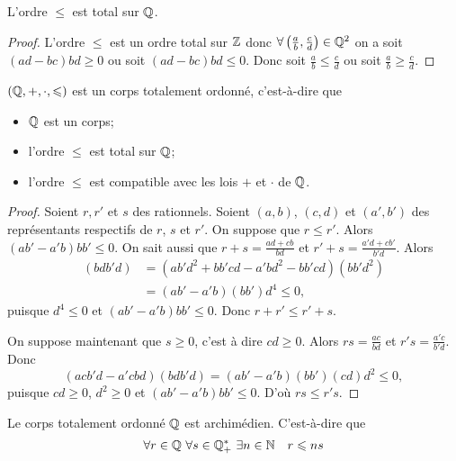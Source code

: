 \begin{prop}
  L'ordre $\leqslant $ est total sur $\mathbb{Q}$.
\end{prop}
\begin{proof}
  L'ordre $\leqslant $ est un ordre total sur $\mathbb{Z}$ donc $\forall \left( \frac{a}{b}, \frac{c}{d} \right) \in \mathbb{Q}^2$ on a soit $(ad-bc)bd \geqslant 0$ ou soit $(ad-bc)bd \leqslant 0$. Donc soit $\frac{a}{b} \leqslant \frac{c}{d}$ ou soit $\frac{a}{b} \geqslant \frac{c}{d}$.
\end{proof}
\begin{prop}
  $(\mathbb{Q},+,\cdot, \leqslant)$ est un corps totalement ordonné, c'est-à-dire que
  \begin{itemize}
  \item $\mathbb{Q}$ est un corps;
  \item l'ordre $\leqslant$ est total sur $\mathbb{Q}$;
  \item l'ordre $\leqslant$ est compatible avec les lois $+$ et $\cdot$ de $\mathbb{Q}$.
  \end{itemize}
\end{prop}
\begin{proof}
  Soient $r,r'$ et $s$ des rationnels. Soient $(a,b)$, $(c,d)$ et $(a',b')$ des représentants respectifs de $r$, $s$ et $r'$. On suppose que $r \leqslant r'$. Alors $(ab'-a'b)bb' \leqslant 0$. On sait aussi que $r+s = \frac{ad+cb}{bd}$ et $r'+s=\frac{a'd+cb'}{b'd}$. Alors
  \begin{align}
    [(ad+bc)b'd-(a'd+cb')bd](bdb'd) &= (ab'd^2+bb'cd-a'bd^2-bb'cd)(bb'd^2) \\
    &=(ab'-a'b)(bb')d^4 \leqslant 0,
  \end{align}
  puisque $d^4 \leqslant 0$ et $(ab'-a'b)bb' \leqslant 0$. Donc $r+r' \leqslant r'+s$.

  On suppose maintenant que $s \geqslant 0$, c'est à dire $cd \geqslant 0$. Alors $rs = \frac{ac}{bd}$ et $r's = \frac{a'c}{b'd}$. Donc
  \begin{equation}
    (acb'd-a'cbd)(bdb'd) = (ab'-a'b)(bb')(cd)d^2 \leqslant 0,
  \end{equation}
  puisque $cd \geqslant 0$, $d^2 \geqslant 0$ et $(ab'-a'b)bb' \leqslant 0$. D'où $rs \leqslant r's$.
\end{proof}
\begin{prop}
  Le corps totalement ordonné $\mathbb{Q}$ est archimédien. C'est-à-dire que
  \begin{equation}
    \forall r \in \mathbb{Q} \ \forall s \in \mathbb{Q}^*_+ \ \exists n \in \mathbb{N} \quad r \leqslant ns
  \end{equation}
\end{prop}
